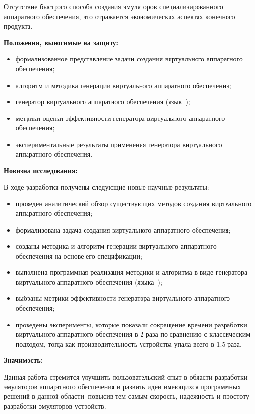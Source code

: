 Отсутствие быстрого способа создания эмуляторов специализированного аппаратного обеспечения, что отражается
экономических аспектах конечного продукта.

\textbf{Положения, выносимые на защиту:}
\begin{itemize}
    \item формализованное представление задачи создания виртуального аппаратного обеспечения;
    \item алгоритм и методика генерации виртуального аппаратного обеспечения;
    \item генератор виртуального аппаратного обеспечения \mbox{(язык {\mylanguage});}
    \item метрики оценки эффективности генератора виртуального аппаратного обеспечения;
    \item экспериментальные результаты применения генератора виртуального аппаратного обеспечения.
\end{itemize}

\textbf{Новизна исследования:}

В ходе разработки получены следующие новые научные результаты:
\begin{itemize}
    \item проведен аналитический обзор существующих методов создания виртуального аппаратного обеспечения;
    \item формализована задача создания виртуального аппаратного обеспечения;
    \item созданы методика и алгоритм генерации виртуального аппаратного обеспечения на основе его спецификации;
    \item выполнена программная реализация методики и алгоритма в виде генератора
          виртуального аппаратного обеспечения \mbox{(языка {\mylanguage});}
    \item выбраны метрики эффективности генератора виртуального аппаратного обеспечения;
    \item проведены эксперименты, которые показали сокращение времени разработки
          виртуального аппаратного обеспечения в $2$ раза по сравнению с классическим
          подходом, тогда как производительность устройства упала всего в $1.5$ раза.
\end{itemize}

\textbf{Значимость:}

Данная работа стремится улучшить пользовательский опыт в области разработки эмуляторов
аппаратного обеспечения и развить идеи имеющихся программных решений в данной области,
повысив тем самым скорость, надежность и простоту разработки эмуляторов устройств.
